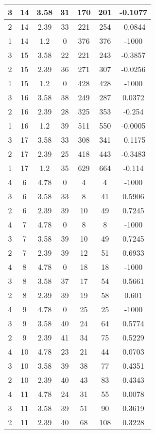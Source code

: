 \documentclass[letterpaper, 12pt]{article}
\begin{document}
\begin{longtable}{|c|c|c|c|c|c|c|}
\hline
3 & 14 & 3.58 & 31 & 170 & 201 & -0.1077 \\
\hline
2 & 14 & 2.39 & 33 & 221 & 254 & -0.0844 \\
\hline
1 & 14 & 1.2 & 0 & 376 & 376 & -1000 \\
\hline
3 & 15 & 3.58 & 22 & 221 & 243 & -0.3857 \\
\hline
2 & 15 & 2.39 & 36 & 271 & 307 & -0.0256 \\
\hline
1 & 15 & 1.2 & 0 & 428 & 428 & -1000 \\
\hline
3 & 16 & 3.58 & 38 & 249 & 287 & 0.0372 \\
\hline
2 & 16 & 2.39 & 28 & 325 & 353 & -0.254 \\
\hline
1 & 16 & 1.2 & 39 & 511 & 550 & -0.0005 \\
\hline
3 & 17 & 3.58 & 33 & 308 & 341 & -0.1175 \\
\hline
2 & 17 & 2.39 & 25 & 418 & 443 & -0.3483 \\
\hline
1 & 17 & 1.2 & 35 & 629 & 664 & -0.114 \\
\hline
4 & 6 & 4.78 & 0 & 4 & 4 & -1000 \\
\hline
3 & 6 & 3.58 & 33 & 8 & 41 & 0.5906 \\
\hline
2 & 6 & 2.39 & 39 & 10 & 49 & 0.7245 \\
\hline
4 & 7 & 4.78 & 0 & 8 & 8 & -1000 \\
\hline
3 & 7 & 3.58 & 39 & 10 & 49 & 0.7245 \\
\hline
2 & 7 & 2.39 & 39 & 12 & 51 & 0.6933 \\
\hline
4 & 8 & 4.78 & 0 & 18 & 18 & -1000 \\
\hline
3 & 8 & 3.58 & 37 & 17 & 54 & 0.5661 \\
\hline
2 & 8 & 2.39 & 39 & 19 & 58 & 0.601 \\
\hline
4 & 9 & 4.78 & 0 & 25 & 25 & -1000 \\
\hline
3 & 9 & 3.58 & 40 & 24 & 64 & 0.5774 \\
\hline
2 & 9 & 2.39 & 41 & 34 & 75 & 0.5229 \\
\hline
4 & 10 & 4.78 & 23 & 21 & 44 & 0.0703 \\
\hline
3 & 10 & 3.58 & 39 & 38 & 77 & 0.4351 \\
\hline
2 & 10 & 2.39 & 40 & 43 & 83 & 0.4343 \\
\hline
4 & 11 & 4.78 & 24 & 31 & 55 & 0.0078 \\
\hline
3 & 11 & 3.58 & 39 & 51 & 90 & 0.3619 \\
\hline
2 & 11 & 2.39 & 40 & 68 & 108 & 0.3228 \\

\end{longtable}
\end{document}
